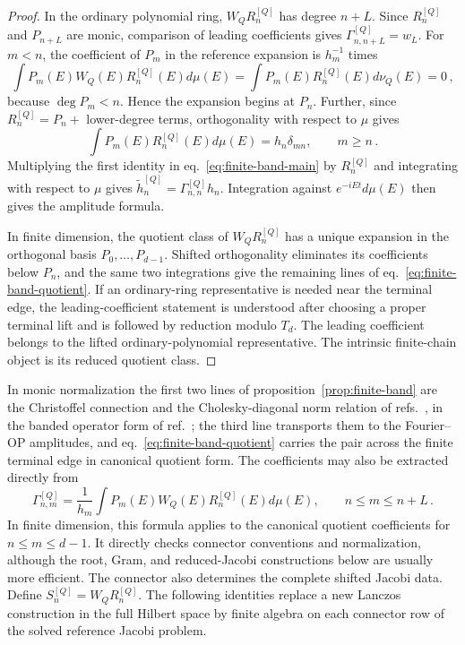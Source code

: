 \documentclass[a4paper,11pt]{article}
\def\dd{d}%
\def\ii{i}%
\def\ee{e}%
\theoremstyle{definition}
\theoremstyle{remark}
\newcommand{\dd}{\mathrm d}
\newcommand{\ii}{\mathrm i}
\newcommand{\ee}{\mathrm e}
\newcommand{\thh}{\widetilde h}
\begin{document}
\begin{proof}
In the ordinary polynomial ring, $W_QR_n^{[Q]}$ has degree $n+L$. Since $R_n^{[Q]}$ and $P_{n+L}$ are monic, comparison of leading coefficients gives
$\Gamma_{n,n+L}^{[Q]}=w_L$. For $m<n$, the coefficient of $P_m$ in the reference expansion is
$h_m^{-1}$ times
\begin{equation}
   \int P_m(E)W_Q(E)R_n^{[Q]}(E)\dd\mu(E)
   =
   \int P_m(E)R_n^{[Q]}(E)\dd\nu_Q(E)
   =
   0\,,
\end{equation}
because $\deg P_m<n$. Hence the expansion begins at $P_n$. Further, since $R_n^{[Q]}=P_n+$ lower-degree terms, orthogonality with respect to $\mu$ gives
\begin{equation}
   \int P_m(E)R_n^{[Q]}(E)\dd\mu(E)
   =
   h_n\delta_{mn},
   \qquad m\ge n\,.
\end{equation}
Multiplying the first identity in eq.~\eqref{eq:finite-band-main} by $R_n^{[Q]}$ and integrating with respect to $\mu$ gives
$\thh_n^{[Q]}=\Gamma_{n,n}^{[Q]}h_n$. Integration against
$\ee^{-\ii Et}\dd\mu(E)$ then gives the amplitude formula.

In finite dimension, the quotient class of $W_QR_n^{[Q]}$ has a unique expansion in the orthogonal basis $P_0,\ldots,P_{d-1}$. Shifted orthogonality eliminates its coefficients below $P_n$, and the same two integrations give the remaining lines of eq.~\eqref{eq:finite-band-quotient}. If an ordinary-ring representative is needed near the terminal edge, the leading-coefficient statement is understood after choosing a proper terminal lift and is followed by reduction modulo $T_d$. The leading coefficient belongs to the lifted ordinary-polynomial representative. The intrinsic finite-chain object is its reduced quotient class.
\end{proof}

In monic normalization the first two lines of proposition~\ref{prop:finite-band} are the Christoffel connection and the Cholesky-diagonal norm relation of refs.~\cite{Uvarov1969,KautskyGolub1983}, in the banded operator form of ref.~\cite{GutlebOlverSlevinsky2024}; the third line transports them to the Fourier--OP amplitudes, and eq.~\eqref{eq:finite-band-quotient} carries the pair across the finite terminal edge in canonical quotient form.
The coefficients may also be extracted directly from
\begin{equation}
   \Gamma_{n,m}^{[Q]}
   =
   \frac{1}{h_m}
   \int P_m(E)W_Q(E)R_n^{[Q]}(E)\dd\mu(E),
   \qquad
   n\le m\le n+L\,.
   \label{eq:Gamma-inner-product-extraction-main}
\end{equation}
In finite dimension, this formula applies to the canonical quotient coefficients for $n\le m\le d-1$. It directly checks connector conventions and normalization, although the root, Gram, and reduced-Jacobi constructions below are usually more efficient.
The connector also determines the complete shifted Jacobi data. Define
$
   S_n^{[Q]}=W_QR_n^{[Q]}.
$
The following identities replace a new Lanczos construction in the full Hilbert space by finite algebra on each connector row of the solved reference Jacobi problem.
\end{document}
